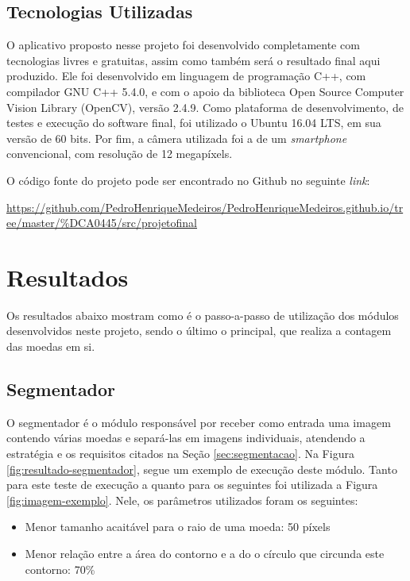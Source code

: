\documentclass[10pt,journal,compsoc]{IEEEtran}
\begin{document}
\subsection{Tecnologias Utilizadas}
\label{sec:tecnologias-envolvidas}

O aplicativo proposto nesse projeto foi desenvolvido completamente com tecnologias livres e gratuitas, assim como também será o resultado final aqui produzido. Ele foi desenvolvido em linguagem de programação C++, com compilador GNU C++ 5.4.0, e com o apoio da biblioteca Open Source Computer Vision Library (OpenCV), versão 2.4.9. Como plataforma de desenvolvimento, de testes e execução do software final, foi utilizado o Ubuntu 16.04 LTS, em sua versão de 60 bits. Por fim, a câmera utilizada foi a de um \textit{smartphone} convencional, com resolução de 12 megapíxels.

O código fonte do projeto pode ser encontrado no Github no seguinte \textit{link}:

\url{https://github.com/PedroHenriqueMedeiros/PedroHenriqueMedeiros.github.io/tree/master/%DCA0445/src/projetofinal}

\section{Resultados}
\label{sec:resultados}

Os resultados  abaixo mostram como é o passo-a-passo de utilização dos módulos desenvolvidos neste projeto, sendo o último o principal, que realiza a contagem das moedas em si. 

\subsection{Segmentador}
\label{sec:segmentador}

O segmentador é o módulo responsável por receber como entrada uma imagem contendo várias moedas e separá-las em imagens individuais, atendendo a estratégia e os requisitos citados na Seção \ref{sec:segmentacao}. Na Figura \ref{fig:resultado-segmentador}, segue um exemplo de execução deste módulo. Tanto para este teste de execução a quanto para os seguintes foi utilizada a Figura \ref{fig:imagem-exemplo}. Nele, os parâmetros utilizados foram os seguintes:

\begin{itemize}  
\item Menor tamanho acaitável para o raio de uma moeda: 50 píxels
\item Menor relação entre a área do contorno e a do o círculo que circunda este contorno: 70\%
\end{itemize}
\end{document}
